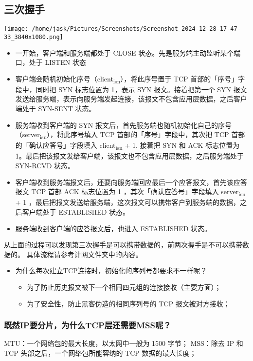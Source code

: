 \documentclass[11pt]{article}
\begin{document}
\subsection{三次握手}
\label{sec:orgbadc9c8}
\begin{center}
\texttt{[image: /home/jask/Pictures/Screenshots/Screenshot\_2024-12-28-17-47-33\_3840x1080.png]}
\end{center}
\begin{itemize}
\item 一开始，客户端和服务端都处于 CLOSE 状态。先是服务端主动监听某个端口，处于 LISTEN 状态
\item 客户端会随机初始化序号（client\textsubscript{isn}），将此序号置于 TCP 首部的「序号」字段中，同时把 SYN 标志位置为 1，表示 SYN 报文。接着把第一个 SYN 报文发送给服务端，表示向服务端发起连接，该报文不包含应用层数据，之后客户端处于 SYN-SENT 状态。
\item 服务端收到客户端的 SYN 报文后，首先服务端也随机初始化自己的序号（server\textsubscript{isn}），将此序号填入 TCP 首部的「序号」字段中，其次把 TCP 首部的「确认应答号」字段填入 client\textsubscript{isn} + 1, 接着把 SYN 和 ACK 标志位置为 1。最后把该报文发给客户端，该报文也不包含应用层数据，之后服务端处于 SYN-RCVD 状态。
\item 客户端收到服务端报文后，还要向服务端回应最后一个应答报文，首先该应答报文 TCP 首部 ACK 标志位置为 1 ，其次「确认应答号」字段填入 server\textsubscript{isn} + 1 ，最后把报文发送给服务端，这次报文可以携带客户到服务端的数据，之后客户端处于 ESTABLISHED 状态。
\item 服务端收到客户端的应答报文后，也进入 ESTABLISHED 状态。
\end{itemize}

从上面的过程可以发现第三次握手是可以携带数据的，前两次握手是不可以携带数据的。
具体流程请参考计网文件夹中的内容。
\begin{itemize}
\item 为什么每次建立TCP连接时，初始化的序列号都要求不一样呢？
\begin{itemize}
\item 为了防止历史报文被下一个相同四元组的连接接收（主要方面）；
\item 为了安全性，防止黑客伪造的相同序列号的 TCP 报文被对方接收；
\end{itemize}
\end{itemize}
\subsubsection{既然IP要分片，为什么TCP层还需要MSS呢？}
\label{sec:orgba192d7}
MTU：一个网络包的最大长度，以太网中一般为 1500 字节；
MSS：除去 IP 和 TCP 头部之后，一个网络包所能容纳的 TCP 数据的最大长度；
\end{document}
